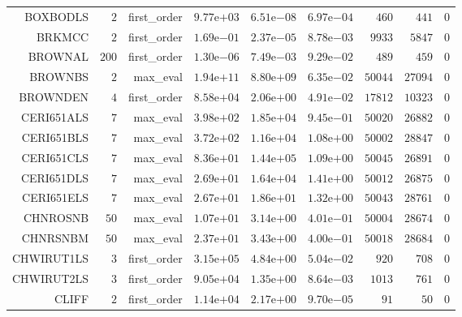 \begin{longtable}{rrrrrrrrr}
BOXBODLS & \(     2\) & first\_order & \( 9.77\)e\(+03\) & \( 6.51\)e\(-08\) & \( 6.97\)e\(-04\) & \(   460\) & \(   441\) & \(     0\) \\
BRKMCC & \(     2\) & first\_order & \( 1.69\)e\(-01\) & \( 2.37\)e\(-05\) & \( 8.78\)e\(-03\) & \(  9933\) & \(  5847\) & \(     0\) \\
BROWNAL & \(   200\) & first\_order & \( 1.30\)e\(-06\) & \( 7.49\)e\(-03\) & \( 9.29\)e\(-02\) & \(   489\) & \(   459\) & \(     0\) \\
BROWNBS & \(     2\) & max\_eval & \( 1.94\)e\(+11\) & \( 8.80\)e\(+09\) & \( 6.35\)e\(-02\) & \( 50044\) & \( 27094\) & \(     0\) \\
BROWNDEN & \(     4\) & first\_order & \( 8.58\)e\(+04\) & \( 2.06\)e\(+00\) & \( 4.91\)e\(-02\) & \( 17812\) & \( 10323\) & \(     0\) \\
CERI651ALS & \(     7\) & max\_eval & \( 3.98\)e\(+02\) & \( 1.85\)e\(+04\) & \( 9.45\)e\(-01\) & \( 50020\) & \( 26882\) & \(     0\) \\
CERI651BLS & \(     7\) & max\_eval & \( 3.72\)e\(+02\) & \( 1.16\)e\(+04\) & \( 1.08\)e\(+00\) & \( 50002\) & \( 28847\) & \(     0\) \\
CERI651CLS & \(     7\) & max\_eval & \( 8.36\)e\(+01\) & \( 1.44\)e\(+05\) & \( 1.09\)e\(+00\) & \( 50045\) & \( 26891\) & \(     0\) \\
CERI651DLS & \(     7\) & max\_eval & \( 2.69\)e\(+01\) & \( 1.64\)e\(+04\) & \( 1.41\)e\(+00\) & \( 50012\) & \( 26875\) & \(     0\) \\
CERI651ELS & \(     7\) & max\_eval & \( 2.67\)e\(+01\) & \( 1.86\)e\(+01\) & \( 1.32\)e\(+00\) & \( 50043\) & \( 28761\) & \(     0\) \\
CHNROSNB & \(    50\) & max\_eval & \( 1.07\)e\(+01\) & \( 3.14\)e\(+00\) & \( 4.01\)e\(-01\) & \( 50004\) & \( 28674\) & \(     0\) \\
CHNRSNBM & \(    50\) & max\_eval & \( 2.37\)e\(+01\) & \( 3.43\)e\(+00\) & \( 4.00\)e\(-01\) & \( 50018\) & \( 28684\) & \(     0\) \\
CHWIRUT1LS & \(     3\) & first\_order & \( 3.15\)e\(+05\) & \( 4.84\)e\(+00\) & \( 5.04\)e\(-02\) & \(   920\) & \(   708\) & \(     0\) \\
CHWIRUT2LS & \(     3\) & first\_order & \( 9.05\)e\(+04\) & \( 1.35\)e\(+00\) & \( 8.64\)e\(-03\) & \(  1013\) & \(   761\) & \(     0\) \\
CLIFF & \(     2\) & first\_order & \( 1.14\)e\(+04\) & \( 2.17\)e\(+00\) & \( 9.70\)e\(-05\) & \(    91\) & \(    50\) & \(     0\) \\

\end{longtable}
